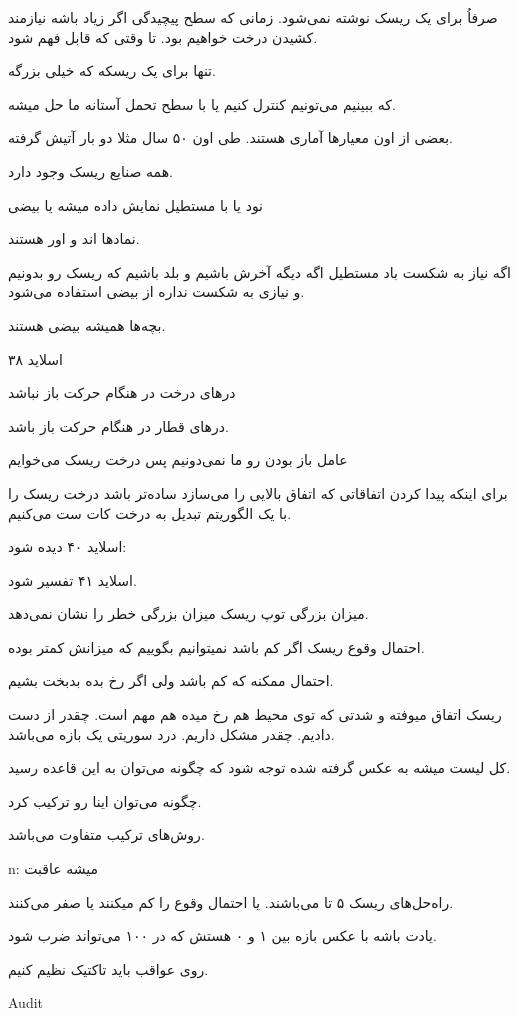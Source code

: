 صرفاُ برای یک ریسک نوشته نمی‌شود. زمانی که سطح پیچیدگی اگر زیاد باشه نیازمند
کشیدن درخت خواهیم بود. تا وقتی که قابل فهم شود.

تنها برای یک ریسکه که خیلی بزرگه.

که ببینیم می‌تونیم کنترل کنیم یا با سطح تحمل آستانه ما حل میشه.

بعضی از اون معیار‌ها آماری هستند. طی اون ۵۰ سال مثلا دو بار آتیش گرفته.

همه صنایع ریسک وجود دارد.

نود یا با مستطیل نمایش داده میشه یا بیضی

نماد‌ها اند و اور هستند.

اگه نیاز به شکست باد مستطیل اگه دیگه آخرش باشیم و بلد باشیم که ریسک رو بدونیم و
نیازی به شکست نداره از بیضی استفاده می‌شود.

بچه‌ها همیشه بیضی هستند.

اسلاید ۳۸

در‌های درخت در هنگام حرکت باز نباشد

در‌های قطار در هنگام حرکت باز باشد.

عامل باز بودن رو ما نمی‌دونیم 
پس درخت ریسک می‌خوایم

برای اینکه پیدا کردن اتفاقاتی که اتفاق بالایی را می‌سازد ساده‌تر باشد درخت ریسک
را با یک الگوریتم تبدیل به درخت کات ست می‌کنیم.

اسلاید ۴۰ دیده شود:

اسلاید ۴۱ تفسیر شود.

میزان بزرگی توپ ریسک میزان بزرگی خطر را نشان نمی‌دهد.

احتمال وقوع ریسک اگر کم باشد نمیتوانیم بگوییم که میزانش کمتر بوده.

احتمال ممکنه که کم باشد ولی اگر رخ بده بدبخت بشیم.

ریسک اتفاق میوفته و شدتی که توی محیط هم رخ میده هم مهم است. چقدر از دست دادیم.
چقدر مشکل داریم. درد سوریتی یک بازه می‌باشد.

کل لیست میشه  به عکس گرفته شده توجه شود که چگونه می‌توان به این قاعده
رسید.

چگونه می‌توان اینا رو ترکیب کرد.

روش‌های ترکیب متفاوت می‌باشد.

n: میشه عاقبت

راه‌حل‌های ریسک ۵ تا می‌باشند. یا احتمال وقوع را کم میکنند یا صفر می‌کنند.

یادت باشه با عکس بازه بین ۱ و ۰ هستش که در ۱۰۰ می‌تواند ضرب شود.

روی عواقب باید تاکتیک نظیم کنیم.

Audit

